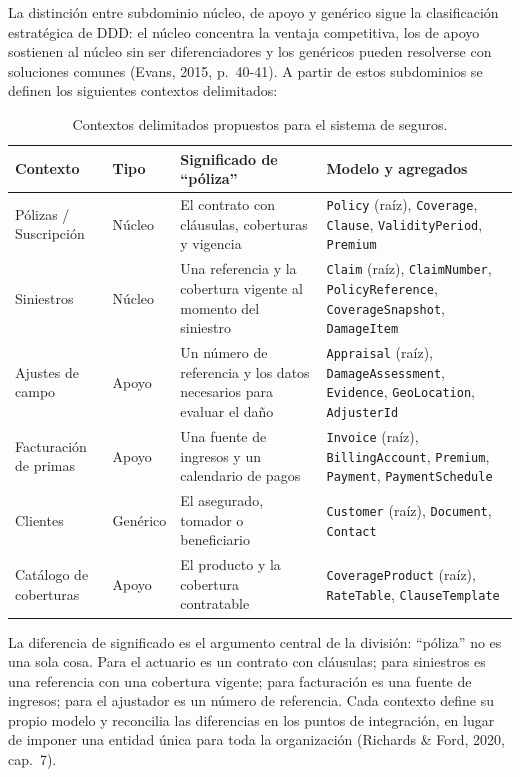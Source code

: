 \documentclass[12pt,a4paper]{article}
\begin{document}
La distinción entre subdominio núcleo, de apoyo y genérico sigue la clasificación estratégica de DDD: el núcleo concentra la ventaja competitiva, los de apoyo sostienen al núcleo sin ser diferenciadores y los genéricos pueden resolverse con soluciones comunes (Evans, 2015, p.~40-41). A partir de estos subdominios se definen los siguientes contextos delimitados:

\begin{table}[htbp]
\centering
\footnotesize
\setlength{\tabcolsep}{4pt}
\begin{tabular}{|>{\raggedright\arraybackslash}p{2.7cm}|>{\raggedright\arraybackslash}p{1.6cm}|>{\raggedright\arraybackslash}p{3.9cm}|>{\raggedright\arraybackslash}p{5.2cm}|}
\hline
\textbf{Contexto} & \textbf{Tipo} & \textbf{Significado de ``póliza''} & \textbf{Modelo y agregados} \\
\hline
Pólizas / Suscripción & Núcleo & El contrato con cláusulas, coberturas y vigencia & \texttt{Policy} (raíz), \texttt{Coverage}, \texttt{Clause}, \texttt{ValidityPeriod}, \texttt{Premium} \\
\hline
Siniestros & Núcleo & Una referencia y la cobertura vigente al momento del siniestro & \texttt{Claim} (raíz), \texttt{ClaimNumber}, \texttt{PolicyReference}, \texttt{CoverageSnapshot}, \texttt{DamageItem} \\
\hline
Ajustes de campo & Apoyo & Un número de referencia y los datos necesarios para evaluar el daño & \texttt{Appraisal} (raíz), \texttt{DamageAssessment}, \texttt{Evidence}, \texttt{GeoLocation}, \texttt{AdjusterId} \\
\hline
Facturación de primas & Apoyo & Una fuente de ingresos y un calendario de pagos & \texttt{Invoice} (raíz), \texttt{BillingAccount}, \texttt{Premium}, \texttt{Payment}, \texttt{PaymentSchedule} \\
\hline
Clientes & Genérico & El asegurado, tomador o beneficiario & \texttt{Customer} (raíz), \texttt{Document}, \texttt{Contact} \\
\hline
Catálogo de coberturas & Apoyo & El producto y la cobertura contratable & \texttt{CoverageProduct} (raíz), \texttt{RateTable}, \texttt{ClauseTemplate} \\
\hline
\end{tabular}
\caption{Contextos delimitados propuestos para el sistema de seguros.}
\end{table}

La diferencia de significado es el argumento central de la división: ``póliza'' no es una sola cosa. Para el actuario es un contrato con cláusulas; para siniestros es una referencia con una cobertura vigente; para facturación es una fuente de ingresos; para el ajustador es un número de referencia. Cada contexto define su propio modelo y reconcilia las diferencias en los puntos de integración, en lugar de imponer una entidad única para toda la organización (Richards \& Ford, 2020, cap.~7).
\end{document}
